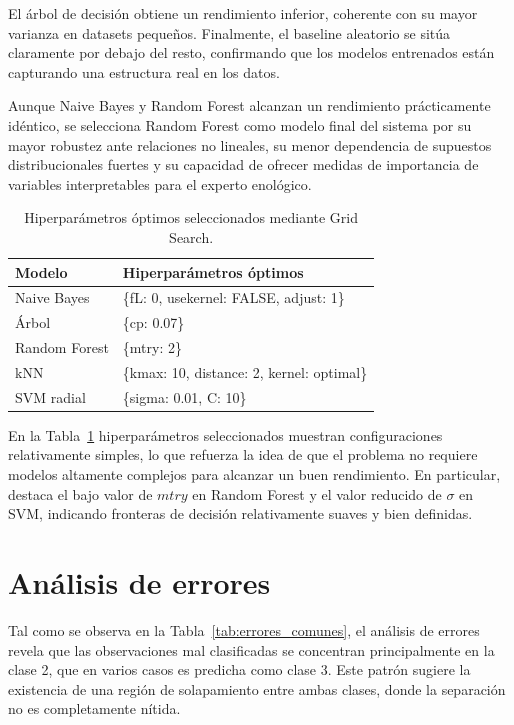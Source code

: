 El árbol de decisión obtiene un rendimiento inferior, coherente con su mayor varianza en datasets
 pequeños. Finalmente, el baseline aleatorio se sitúa claramente por debajo del resto, confirmando 
 que los modelos entrenados están capturando una estructura real en los datos.

Aunque Naive Bayes y Random Forest alcanzan un rendimiento prácticamente idéntico, se selecciona
 Random Forest como modelo final del sistema por su mayor robustez ante relaciones no lineales, su 
 menor dependencia de supuestos distribucionales fuertes y su capacidad de ofrecer medidas de importancia 
 de variables interpretables para el experto enológico.

\begin{table}[h]
    \centering
    \caption{Hiperparámetros óptimos seleccionados mediante Grid Search.}
    \vspace{0.2cm}
    \begin{tabular}{l l}
        \hline
        \textbf{Modelo} & \textbf{Hiperparámetros óptimos} \\
        \hline
        Naive Bayes & \{fL: 0, usekernel: FALSE, adjust: 1\} \\
        Árbol & \{cp: 0.07\} \\
        Random Forest & \{mtry: 2\} \\
        kNN & \{kmax: 10, distance: 2, kernel: optimal\} \\
        SVM radial & \{sigma: 0.01, C: 10\} \\
        \hline
    \end{tabular}
    \label{tab:hiperparametros}
\end{table}
\vspace{0.5cm}

En la Tabla~\ref{tab:hiperparametros} hiperparámetros seleccionados muestran configuraciones relativamente simples, lo que refuerza la idea de que el problema no requiere modelos altamente complejos para alcanzar un buen rendimiento. En particular, destaca el bajo valor de $mtry$ en Random Forest y el valor reducido de $\sigma$ en SVM, indicando fronteras de decisión relativamente suaves y bien definidas.

\section{Análisis de errores}

Tal como se observa en la Tabla~\ref{tab:errores_comunes}, el análisis de errores revela que las observaciones mal clasificadas se concentran principalmente en la clase 2, que en varios casos es predicha como clase 3. Este patrón sugiere la existencia de una región de solapamiento entre ambas clases, donde la separación no es completamente nítida.

